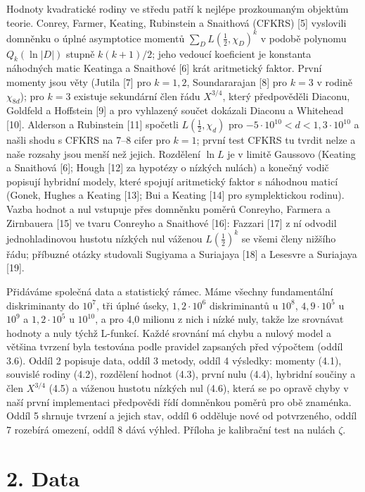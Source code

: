 \documentclass[
  10pt,
]{article}
\begin{document}
Hodnoty kvadratické rodiny ve středu patří k nejlépe prozkoumaným
objektům teorie. Conrey, Farmer, Keating, Rubinstein a Snaithová (CFKRS)
{[}5{]} vyslovili domněnku o úplné asymptotice momentů
\(\sum_D L(\tfrac12, \chi_D)^k\) v podobě polynomu \(Q_k(\ln|D|)\)
stupně \(k(k+1)/2\); jeho vedoucí koeficient je konstanta náhodných
matic Keatinga a Snaithové {[}6{]} krát aritmetický faktor. První
momenty jsou věty (Jutila {[}7{]} pro \(k = 1, 2\), Soundararajan
{[}8{]} pro \(k = 3\) v rodině \(\chi_{8d}\)); pro \(k = 3\) existuje
sekundární člen řádu \(X^{3/4}\), který předpověděli Diaconu, Goldfeld a
Hoffstein {[}9{]} a pro vyhlazený součet dokázali Diaconu a Whitehead
{[}10{]}. Alderson a Rubinstein {[}11{]} spočetli
\(L(\tfrac12, \chi_d)\) pro \(-5\cdot10^{10} < d < 1{,}3\cdot10^{10}\) a
našli shodu s CFKRS na 7--8 cifer pro \(k = 1\); první test CFKRS tu
tvrdit nelze a naše rozsahy jsou menší než jejich. Rozdělení \(\ln L\)
je v limitě Gaussovo (Keating a Snaithová {[}6{]}; Hough {[}12{]} za
hypotézy o nízkých nulách) a konečný vodič popisují hybridní modely,
které spojují aritmetický faktor s náhodnou maticí (Gonek, Hughes a
Keating {[}13{]}; Bui a Keating {[}14{]} pro symplektickou rodinu).
Vazba hodnot a nul vstupuje přes domněnku poměrů Conreyho, Farmera a
Zirnbauera {[}15{]} ve tvaru Conreyho a Snaithové {[}16{]}: Fazzari
{[}17{]} z ní odvodil jednohladinovou hustotu nízkých nul váženou
\(L(\tfrac12)^k\) se všemi členy nižšího řádu; příbuzné otázky studovali
Sugiyama a Suriajaya {[}18{]} a Lesesvre a Suriajaya {[}19{]}.

Přidáváme společná data a statistický rámec. Máme všechny fundamentální
diskriminanty do \(10^7\), tři úplné úseky, \(1{,}2\cdot10^6\)
diskriminantů u \(10^8\), \(4{,}9\cdot10^5\) u \(10^9\) a
\(1{,}2\cdot10^5\) u \(10^{10}\), a pro 4,0 milionu z nich i nízké nuly,
takže lze srovnávat hodnoty a nuly týchž L-funkcí. Každé srovnání má
chybu a nulový model a většina tvrzení byla testována podle pravidel
zapsaných před výpočtem (oddíl 3.6). Oddíl 2 popisuje data, oddíl 3
metody, oddíl 4 výsledky: momenty (4.1), souvislé rodiny (4.2),
rozdělení hodnot (4.3), první nulu (4.4), hybridní součiny a člen
\(X^{3/4}\) (4.5) a váženou hustotu nízkých nul (4.6), která se po
opravě chyby v naší první implementaci předpovědi řídí domněnkou poměrů
pro obě znaménka. Oddíl 5 shrnuje tvrzení a jejich stav, oddíl 6
odděluje nové od potvrzeného, oddíl 7 rozebírá omezení, oddíl 8 dává
výhled. Příloha je kalibrační test na nulách \(\zeta\).

\hypertarget{data}{%
\section{2. Data}\label{data}}
\end{document}

